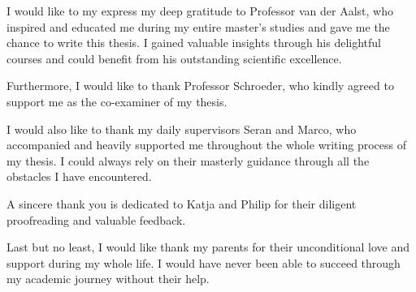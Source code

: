 I would like to my express my deep gratitude to Professor van der Aalst, who inspired and educated me during my entire master’s studies and gave me the chance to write this thesis.
I gained valuable insights through his delightful courses and could benefit from his outstanding scientific excellence.

Furthermore, I would like to thank Professor Schroeder, who kindly agreed to support me as the co-examiner of my thesis.

I would also like to thank my daily supervisors Seran and Marco, who accompanied and heavily supported me throughout the whole writing process of my thesis.
I could always rely on their masterly guidance through all the obstacles I have encountered.

A sincere thank you is dedicated to Katja and Philip for their diligent proofreading and valuable feedback.

Last but no least, I would like thank my parents for their unconditional love and support during my whole life.
I would have never been able to succeed through my academic journey without their help.